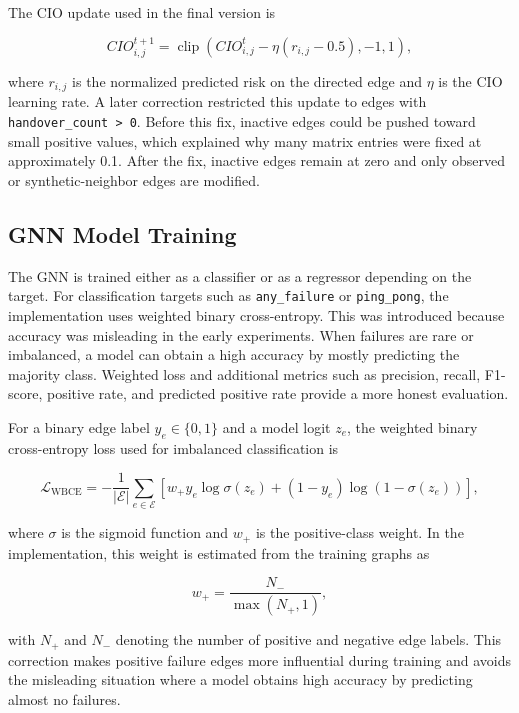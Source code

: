 \documentclass[11pt, a4paper, twoside]{article}
\begin{document}
The CIO update used in the final version is

\begin{equation}
CIO_{i,j}^{t+1} = \operatorname{clip}\left(CIO_{i,j}^{t} - \eta (r_{i,j} - 0.5), -1, 1\right),
\end{equation}

where $r_{i,j}$ is the normalized predicted risk on the directed edge and $\eta$ is the CIO learning rate. A later correction restricted this update to edges with \texttt{handover\_count > 0}. Before this fix, inactive edges could be pushed toward small positive values, which explained why many matrix entries were fixed at approximately 0.1. After the fix, inactive edges remain at zero and only observed or synthetic-neighbor edges are modified.

\subsection{GNN Model Training}

The GNN is trained either as a classifier or as a regressor depending on the target. For classification targets such as \texttt{any\_failure} or \texttt{ping\_pong}, the implementation uses weighted binary cross-entropy. This was introduced because accuracy was misleading in the early experiments. When failures are rare or imbalanced, a model can obtain a high accuracy by mostly predicting the majority class. Weighted loss and additional metrics such as precision, recall, F1-score, positive rate, and predicted positive rate provide a more honest evaluation.

For a binary edge label $y_e \in \{0,1\}$ and a model logit $z_e$, the weighted binary cross-entropy loss used for imbalanced classification is

\begin{equation}
\mathcal{L}_{\text{WBCE}} =
-\frac{1}{|\mathcal{E}|}
\sum_{e \in \mathcal{E}}
\left[
w_+ y_e \log \sigma(z_e)
+ (1-y_e)\log(1-\sigma(z_e))
\right],
\end{equation}

where $\sigma$ is the sigmoid function and $w_+$ is the positive-class weight. In the implementation, this weight is estimated from the training graphs as

\begin{equation}
w_+ = \frac{N_-}{\max(N_+,1)},
\end{equation}

with $N_+$ and $N_-$ denoting the number of positive and negative edge labels. This correction makes positive failure edges more influential during training and avoids the misleading situation where a model obtains high accuracy by predicting almost no failures.
\end{document}
